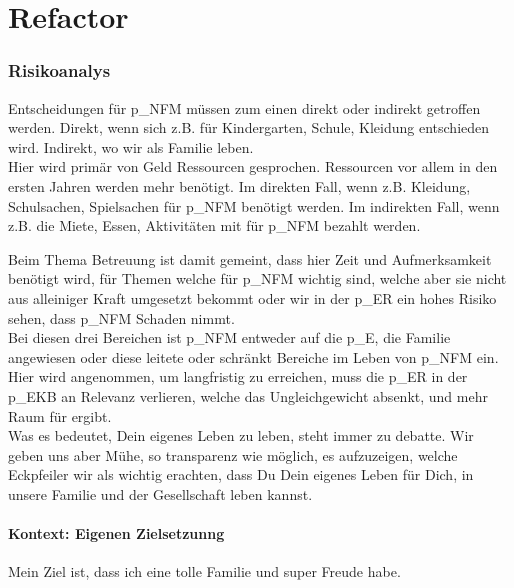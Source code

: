 \part{Refactor}
\section{Risikoanalys}

Entscheidungen für \gls{p_NFM} müssen zum einen direkt oder indirekt getroffen werden.
Direkt, wenn sich z.B. für Kindergarten, Schule, Kleidung entschieden wird. Indirekt, wo wir als Familie leben.\\

Hier wird primär von Geld Ressourcen gesprochen. Ressourcen vor allem in den ersten Jahren werden mehr benötigt. Im direkten Fall, wenn z.B. Kleidung, Schulsachen, Spielsachen für \gls{p_NFM} benötigt werden. Im indirekten Fall, wenn z.B. die Miete, Essen, Aktivitäten mit für \gls{p_NFM} bezahlt werden.

Beim Thema Betreuung ist damit gemeint, dass hier Zeit und Aufmerksamkeit benötigt wird, für Themen welche für \gls{p_NFM} wichtig sind, welche aber sie nicht aus alleiniger Kraft umgesetzt bekommt oder wir in der \gls{p_ER} ein hohes Risiko sehen, dass \gls{p_NFM} Schaden nimmt.\\

Bei diesen drei Bereichen ist \gls{p_NFM} entweder auf die \gls{p_E}, die Familie angewiesen oder diese leitete oder schränkt Bereiche im Leben von \gls{p_NFM} ein. Hier wird angenommen, um  langfristig zu erreichen, muss die \gls{p_ER} in der \gls{p_EKB} an Relevanz verlieren, welche das Ungleichgewicht absenkt, und mehr Raum für  ergibt.\\


Was es bedeutet, Dein eigenes Leben zu leben, steht immer zu debatte. Wir geben uns aber Mühe, so transparenz wie möglich, es aufzuzeigen, welche Eckpfeiler wir als wichtig erachten, dass Du Dein eigenes Leben für Dich, in unsere Familie und der Gesellschaft leben kannst.

\subsection{Kontext: Eigenen Zielsetzunng}

Mein Ziel ist, dass ich eine tolle Familie und super Freude habe.\\


